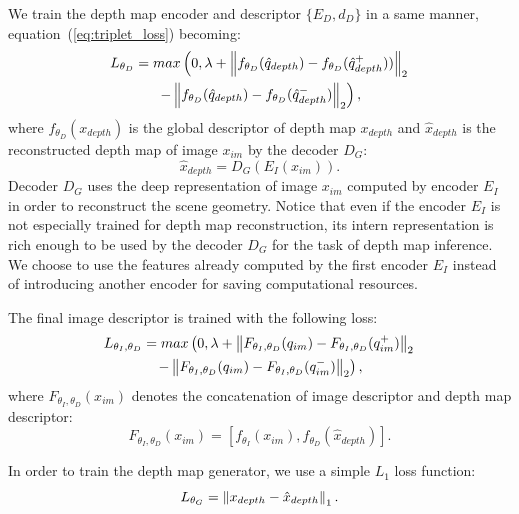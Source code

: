 We train the depth map encoder and descriptor $\{E_D, d_D\}$ in a same manner, equation~(\ref{eq:triplet_loss}) becoming:
\begin{multline}
	\label{eq:depth_triplet_loss}
	L_{\theta_{D}}  = max\left(0, \lambda + \left\lVert f_{\theta_{D}}(\hat{q}_{depth}) - f_{\theta_{D}}(\hat{q}_{depth}^+))\right\rVert_2  \right. \\	
	\left. - \left\lVert f_{\theta_{D}}(\hat{q}_{depth}) - f_{\theta_{D}}(\hat{q}_{depth}^-)\right\rVert_2 \right),
\end{multline}
where $f_{\theta_{D}}(x_{depth})$ is the global descriptor of depth map $x_{depth}$ and $\hat{x}_{depth}$ is the reconstructed depth map of image $x_{im}$ by the decoder $D_G$:
\begin{equation}
	\label{eq:generator}
	\hat{x}_{depth} = D_G(E_I(x_{im})).
\end{equation}
Decoder $D_G$ uses the deep representation of image $x_{im}$ computed by encoder $E_I$ in order to reconstruct the scene geometry. Notice that even if the encoder $E_I$ is not especially trained for depth map reconstruction, its intern representation is rich enough to be used by the decoder $D_G$ for the task of depth map inference. We choose to use the features already computed by the first encoder $E_I$ instead of introducing another encoder for saving computational resources.

The final image descriptor is trained with the following loss:
\begin{multline}
	\label{eq:cat_triplet_loss}
	L_{\theta_{I},\theta_{D}} = max\left(0, \lambda + \left\lVert F_{\theta_{I},\theta_{D}}(q_{im}) - F_{\theta_{I},\theta_{D}}(q_{im}^+)\right\rVert_2  \right. \\	
	\left. - \left\lVert F_{\theta_{I},\theta_{D}}(q_{im}) - F_{\theta_{I},\theta_{D}}(q_{im}^-)\right\rVert_2 \right),
\end{multline}
where $F_{\theta_{I},\theta_{D}}(x_{im})$ denotes the concatenation of image descriptor and depth map descriptor:
\begin{equation}
	\label{eq:cat_function}
	F_{\theta_{I},\theta_{D}}(x_{im}) = \left[ f_{\theta_{I}}(x_{im}), f_{\theta_{D}}(\hat{x}_{depth}) \right].
\end{equation}

In order to train the depth map generator, we use a simple $L_1$ loss function:
\begin{equation}
 \label{eq:l1_loss}
	L_{\theta_{G}} = \left\lVert x_{depth} - \hat{x}_{depth}\right\rVert_{1}.
\end{equation}

